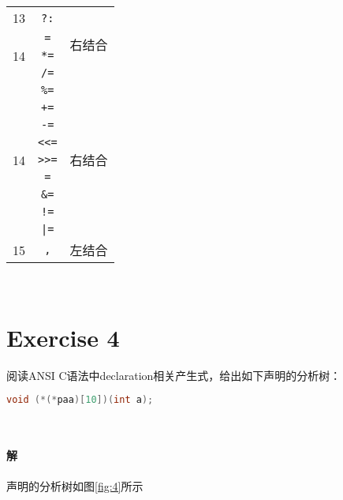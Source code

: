 \documentclass{article}
\begin{document}
\begin{longtable}{|c|c|c|}
    13 & \texttt{?:} & \multirow{4}{*}{右结合} \\ \cline{1-2}
    \multirow{3}{*}{14} 
     & \texttt{=} &  \\ \cline{2-2}
     & \texttt{*=} &  \\ \cline{2-2}
     & \texttt{/=} &  \\ \cline{2-2}
    \multirow{9}{*}{14}
     & \texttt{\%=} & \multirow{9}{*}{右结合} \\ \cline{2-2}
     & \texttt{+=} &  \\ \cline{2-2}
     & \texttt{-=} &  \\ \cline{2-2}
     & \texttt{{<}<=} & \\ \cline{2-2}
     & \texttt{{>}>=} &\\ \cline{2-2}
     & \texttt{=} &  \\ \cline{2-2}
     & \texttt{\&=} &  \\ \cline{2-2}
     & \texttt{!=} &  \\ \cline{2-2}
     & \texttt{|=} &  \\ \hline
    15 & \texttt{,} & 左结合 \\ \hline
\end{longtable}

\\

\section{Exercise 4}
阅读ANSI C语法中declaration相关产生式，给出如下声明的分析树：
\begin{lstlisting}[language = C++, 
         keywordstyle=\bfseries\color{blue!70},
         commentstyle=\color{red!40!green!60!blue},
         frame=shadowbox,
         rulesepcolor=\color{red!20!green!30!blue!20},
         basicstyle=\ttfamily]
  void (*(*paa)[10])(int a);
\end{lstlisting}
\\

\paragraph{解}
声明的分析树如图\ref{fig:4}所示
\end{document}
